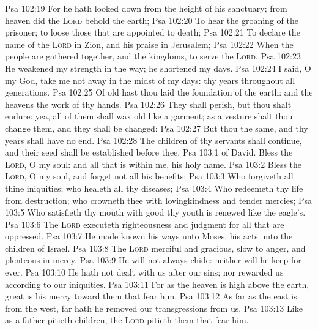 \vs Psa 102:19 For he hath looked down from the height of his sanctuary; from heaven did the \textsc{Lord} behold the earth;
\vs Psa 102:20 To hear the groaning of the prisoner; to loose those that are appointed to death;
\vs Psa 102:21 To declare the name of the \textsc{Lord} in Zion, and his praise in Jerusalem;
\vs Psa 102:22 When the people are gathered together, and the kingdoms, to serve the \textsc{Lord}.
\vs Psa 102:23 He weakened my strength in the way; he shortened my days.
\vs Psa 102:24 I said, O my God, take me not away in the midst of my days: thy years  throughout all generations.
\vs Psa 102:25 Of old hast thou laid the foundation of the earth: and the heavens  the work of thy hands.
\vs Psa 102:26 They shall perish, but thou shalt endure: yea, all of them shall wax old like a garment; as a vesture shalt thou change them, and they shall be changed:
\vs Psa 102:27 But thou  the same, and thy years shall have no end.
\vs Psa 102:28 The children of thy servants shall continue, and their seed shall be established before thee.
\vs Psa 103:1  of David. Bless the \textsc{Lord}, O my soul: and all that is within me,  his holy name.
\vs Psa 103:2 Bless the \textsc{Lord}, O my soul, and forget not all his benefits:
\vs Psa 103:3 Who forgiveth all thine iniquities; who healeth all thy diseases;
\vs Psa 103:4 Who redeemeth thy life from destruction; who crowneth thee with lovingkindness and tender mercies;
\vs Psa 103:5 Who satisfieth thy mouth with good  thy youth is renewed like the eagle's.
\vs Psa 103:6 The \textsc{Lord} executeth righteousness and judgment for all that are oppressed.
\vs Psa 103:7 He made known his ways unto Moses, his acts unto the children of Israel.
\vs Psa 103:8 The \textsc{Lord}  merciful and gracious, slow to anger, and plenteous in mercy.
\vs Psa 103:9 He will not always chide: neither will he keep  for ever.
\vs Psa 103:10 He hath not dealt with us after our sins; nor rewarded us according to our iniquities.
\vs Psa 103:11 For as the heaven is high above the earth,  great is his mercy toward them that fear him.
\vs Psa 103:12 As far as the east is from the west,  far hath he removed our transgressions from us.
\vs Psa 103:13 Like as a father pitieth  children,  the \textsc{Lord} pitieth them that fear him.

